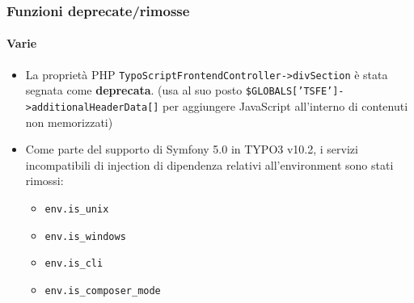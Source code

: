 \begin{frame}[fragile]
	\frametitle{Funzioni deprecate/rimosse}
	\framesubtitle{Varie}

	\lstset{basicstyle=\tiny\ttfamily}

	\begin{itemize}

		\item La proprietà PHP \texttt{TypoScriptFrontendController->divSection} è stata segnata come \textbf{deprecata}.\newline
			\smaller
				(usa al suo posto \texttt{\$GLOBALS['TSFE']->additionalHeaderData[]} per aggiungere JavaScript all'interno di contenuti non memorizzati)
			\normalsize

		\item Come parte del supporto di Symfony 5.0 in TYPO3 v10.2, i servizi incompatibili di injection di dipendenza relativi all'environment sono stati rimossi:

			\begin{itemize}
				\item \texttt{env.is\_unix}
				\item \texttt{env.is\_windows}
				\item \texttt{env.is\_cli}
				\item \texttt{env.is\_composer\_mode}
			\end{itemize}

	\end{itemize}

\end{frame}

